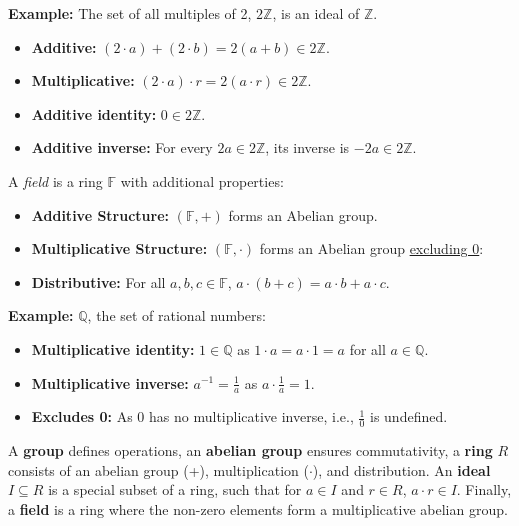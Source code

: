 \noindent
\textbf{Example:} The set of all multiples of 2, $2\mathbb{Z}$, is an ideal of $\mathbb{Z}$.
\begin {itemize}
\item \textbf{Additive:} $(2\cdot a)+(2\cdot b)=2(a+b)\in 2\mathbb{Z}$.
\item \textbf{Multiplicative:} $(2\cdot a)\cdot r=2(a\cdot r)\in 2\mathbb{Z}$.
\item \textbf{Additive identity:} $0\in 2\mathbb{Z}$.
\item \textbf{Additive inverse:} For every $2a \in 2\mathbb{Z}$, its inverse is $-2a \in 2\mathbb{Z}$.
\end{itemize}


\begin{Def}[Field]

    A \textit{field} is a ring $\mathbb{F}$ with additional properties:
    \begin{itemize}
        \item \textbf{Additive Structure:} $(\mathbb{F},+)$ forms an Abelian group.
        \item \textbf{Multiplicative Structure:} $(\mathbb{F},\cdot)$ forms an Abelian group \underline{excluding 0}:
        \item \textbf{Distributive:} For all $a,b,c\in\mathbb{F}$, $a\cdot(b+c)=a\cdot b+a\cdot c$.
    \end{itemize}
\end{Def}

\noindent
\textbf{Example:} $\mathbb{Q}$, the set of rational numbers:
\begin{itemize}
    \item \textbf{Multiplicative identity:} $1\in\mathbb{Q}$ as $1\cdot a=a\cdot 1=a$ for all $a\in\mathbb{Q}$.
    \item \textbf{Multiplicative inverse:} $a^{-1}=\frac{1}{a}$ as $a\cdot\frac{1}{a}=1$.
    \item \textbf{Excludes 0:} As $0$ has no multiplicative inverse, i.e., $\frac{1}{0}$ is undefined.
\end{itemize}
\begin{Tip}
    A \textbf{group} defines operations, an \textbf{abelian group} ensures commutativity, a \textbf{ring} $R$ consists of an abelian group (+), multiplication ($\cdot$), and distribution. An \textbf{ideal} $I \subseteq R$ is a special subset of a ring, such that for $a \in I$ and $r \in R$, $a \cdot r \in I$. Finally, a \textbf{field} is a ring where the non-zero elements form a multiplicative abelian group.
\end{Tip}


